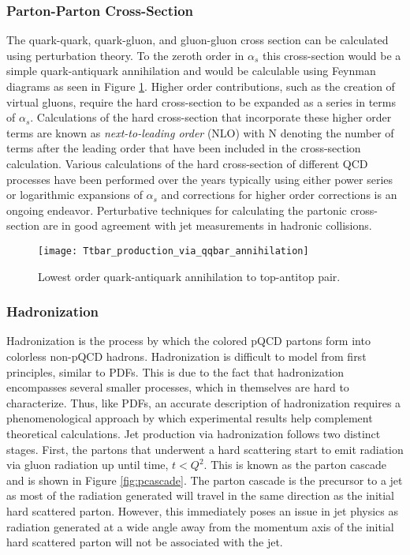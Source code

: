 \subsubsection{Parton-Parton Cross-Section}
The quark-quark, quark-gluon, and gluon-gluon cross section can be calculated using perturbation theory.  To the zeroth order in $\alpha_{s}$ this cross-section would be a simple quark-antiquark annihilation and would be calculable using Feynman diagrams as seen in Figure \ref{fig:qqbar}\cite{Collins:1989gx}.  Higher order contributions, such as the creation of virtual gluons, require the hard cross-section to be expanded as a series in terms of $\alpha_{s}$.  Calculations of the hard cross-section that incorporate these higher order terms are known as \textit{next-to-leading order} (NLO) with N denoting the number of terms after the leading order that have been included in the cross-section calculation.  Various calculations of the hard cross-section of different QCD processes have been performed over the years typically using either power series or logarithmic expansions of $\alpha_{s}$\cite{Brambilla:2006wp} and corrections for higher order corrections is an ongoing endeavor.  Perturbative techniques for calculating the partonic cross-section are in good agreement with jet measurements in hadronic collisions\cite{Fritzsch:1992mu}.

\begin{figure}[b!]
\texttt{[image: Ttbar\_production\_via\_qqbar\_annihilation]}
\centering
\caption{Lowest order quark-antiquark annihilation to top-antitop pair\cite{Erdmann:2001ne}.}
\label{fig:qqbar}
\end{figure}

\subsubsection{Hadronization}

Hadronization is the process by which the colored pQCD partons form into colorless non-pQCD hadrons.  Hadronization is difficult to model from first principles, similar to PDFs.  This is due to the fact that hadronization encompasses several smaller processes, which in themselves are hard to characterize. Thus, like PDFs, an accurate description of hadronization requires a phenomenological approach by which experimental results help complement theoretical calculations.  Jet production via hadronization\cite{Webber:1994zd} follows two distinct stages.  First, the partons that underwent a hard scattering start to emit radiation via gluon radiation up until time, $t < Q^{2}$.  This is known as the parton cascade and is shown in Figure \ref{fig:pcascade}.  The parton cascade is the precursor to a jet as most of the radiation generated will travel in the same direction as the initial hard scattered parton.  However, this immediately poses an issue in jet physics as radiation generated at a wide angle away from the momentum axis of the initial hard scattered parton will not be associated with the jet.

